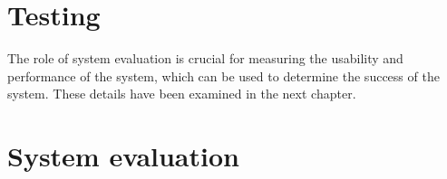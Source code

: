 \documentclass[
	paper=A4,
	titlepage=true,
	appendixprefix=true,
	headings=appendixwithoutprefixline,
	fontsize=11pt,
	parskip=half
]{scrreprt}
\begin{document}

	\chapter{Testing} {
	\label{ch:testing}
		
	}

	The role of system evaluation is crucial for measuring the usability and performance of the system, which can be used to determine the success of the system. These details have been examined in the next chapter.

	\chapter{System evaluation} {
	\label{ch:system_evaluation}
		
	}


	

	
\end{document}

